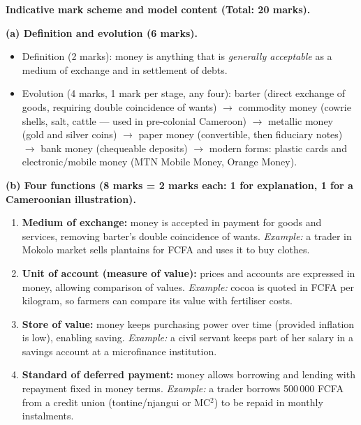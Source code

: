\documentclass[11pt]{article}
\begin{document}
\begin{corrige}
\textbf{Indicative mark scheme and model content (Total: 20 marks).}

\textbf{(a) Definition and evolution (6 marks).}
\begin{itemize}
\item Definition (2 marks): money is anything that is \emph{generally acceptable} as a medium of exchange and in settlement of debts.
\item Evolution (4 marks, 1 mark per stage, any four): barter (direct exchange of goods, requiring double coincidence of wants) $\rightarrow$ commodity money (cowrie shells, salt, cattle — used in pre-colonial Cameroon) $\rightarrow$ metallic money (gold and silver coins) $\rightarrow$ paper money (convertible, then fiduciary notes) $\rightarrow$ bank money (chequeable deposits) $\rightarrow$ modern forms: plastic cards and electronic/mobile money (MTN Mobile Money, Orange Money).
\end{itemize}

\textbf{(b) Four functions (8 marks = 2 marks each: 1 for explanation, 1 for a Cameroonian illustration).}
\begin{enumerate}
\item \textbf{Medium of exchange:} money is accepted in payment for goods and services, removing barter's double coincidence of wants. \emph{Example:} a trader in Mokolo market sells plantains for FCFA and uses it to buy clothes.
\item \textbf{Unit of account (measure of value):} prices and accounts are expressed in money, allowing comparison of values. \emph{Example:} cocoa is quoted in FCFA per kilogram, so farmers can compare its value with fertiliser costs.
\item \textbf{Store of value:} money keeps purchasing power over time (provided inflation is low), enabling saving. \emph{Example:} a civil servant keeps part of her salary in a savings account at a microfinance institution.
\item \textbf{Standard of deferred payment:} money allows borrowing and lending with repayment fixed in money terms. \emph{Example:} a trader borrows 500\,000 FCFA from a credit union (tontine/njangui or MC$^2$) to be repaid in monthly instalments.
\end{enumerate}


\end{corrige}
\end{document}
